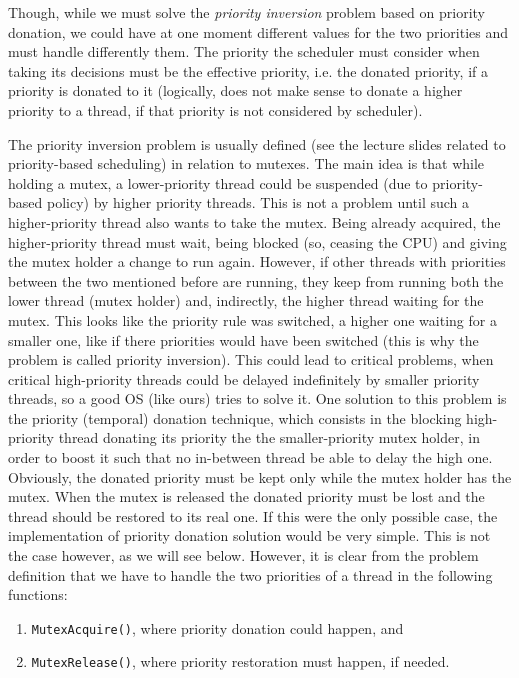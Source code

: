 Though, while we must solve the \textit{priority inversion} problem based on priority donation, we could have at one moment different values for the two priorities and must handle differently them. The priority the scheduler must consider when taking its decisions must be the effective priority, i.e. the donated priority, if a priority is donated to it (logically, does not make sense to donate a higher priority to a thread, if that priority is not considered by scheduler). 

The priority inversion problem is usually defined (see the lecture slides related to priority-based scheduling) in relation to mutexes. The main idea is that while holding a mutex, a lower-priority thread could be suspended (due to priority-based policy) by higher priority threads. This is not a problem until such a higher-priority thread also wants to take the mutex. Being already acquired, the higher-priority thread must wait, being blocked (so, ceasing the CPU) and giving the mutex holder a change to run again. However, if other threads with priorities between the two mentioned before are running, they keep from running both the lower thread (mutex holder) and, indirectly, the higher thread waiting for the mutex. This looks like the priority rule was switched, a higher one waiting for a smaller one, like if there priorities would have been switched (this is why the problem is called priority inversion). This could lead to critical problems, when critical high-priority threads could be delayed indefinitely by smaller priority threads, so a good OS (like ours) tries to solve it. One solution to this problem is the priority (temporal) donation technique, which consists in the blocking high-priority thread donating its priority the the smaller-priority mutex holder, in order to boost it such that no in-between thread be able to delay the high one. Obviously, the donated priority must be kept only while the mutex holder has the mutex. When the mutex is released the donated priority must be lost and the thread should be restored to its real one. If this were the only possible case, the implementation of priority donation solution would be very simple. This is not the case however, as we will see below. However, it is clear from the problem definition that we have to handle the two priorities of a thread in the following functions:
\begin{enumerate}
    \item \lstinline|MutexAcquire()|, where priority donation could happen, and
    \item \lstinline|MutexRelease()|, where priority restoration must happen, if needed.
\end{enumerate}

